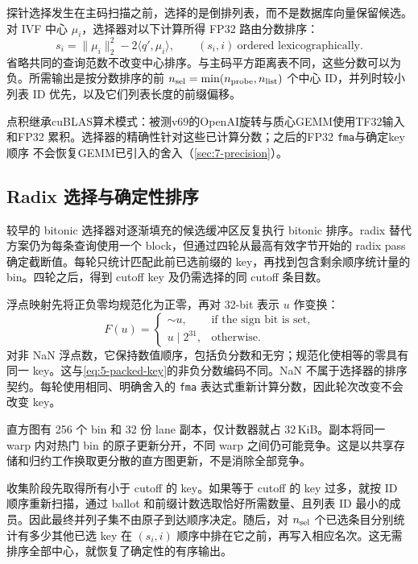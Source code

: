 探针选择发生在主码扫描之前，选择的是倒排列表，而不是数据库向量保留候选。对 IVF 中心 $\mu_i$，选择器对以下计算所得 FP32 路由分数排序：
\begin{equation}
 s_i=\|\mu_i\|_2^2-2\langle q',\mu_i\rangle,
 \qquad (s_i,i)\ \text{ordered lexicographically}.
 \label{eq:5-probe-score}
\end{equation}
省略共同的查询范数不改变中心排序。与主码平方距离表不同，这些分数可以为负。所需输出是按分数排序的前 $n_{\rm sel}=\min(n_{\rm probe},n_{\rm list})$ 个中心 ID，并列时较小列表 ID 优先，以及它们列表长度的前缀偏移。

点积继承cuBLAS算术模式：被测v69的OpenAI旋转与质心GEMM使用TF32输入和FP32
累积。选择器的精确性针对这些已计算分数；之后的FP32 \texttt{fma}与确定key顺序
不会恢复GEMM已引入的舍入（\cref{sec:7-precision}）。

\subsection{Radix 选择与确定性排序}

较早的 bitonic 选择器对逐渐填充的候选缓冲区反复执行 bitonic 排序。radix 替代方案仍为每条查询使用一个 block，但通过四轮从最高有效字节开始的 radix pass 确定截断值。每轮只统计匹配此前已选前缀的 key，再找到包含剩余顺序统计量的 bin。四轮之后，得到 cutoff key 及仍需选择的同 cutoff 条目数。

浮点映射先将正负零均规范化为正零，再对 32-bit 表示 $u$ 作变换：
\begin{equation}
 F(u)=\begin{cases}
       \mathop{\sim}u,&\text{if the sign bit is set},\\
       u\mathbin{|}2^{31},&\text{otherwise}.
      \end{cases}
 \label{eq:5-probe-key}
\end{equation}
对非 NaN 浮点数，它保持数值顺序，包括负分数和无穷；规范化使相等的零具有同一 key。这与\cref{eq:5-packed-key}的非负分数编码不同。NaN 不属于选择器的排序契约。每轮使用相同、明确舍入的 \texttt{fma} 表达式重新计算分数，因此轮次改变不会改变 key。

直方图有 256 个 bin 和 32 份 lane 副本，仅计数器就占 32\,KiB。副本将同一 warp 内对热门 bin 的原子更新分开，不同 warp 之间仍可能竞争。这是以共享存储和归约工作换取更分散的直方图更新，不是消除全部竞争。

收集阶段先取得所有小于 cutoff 的 key。如果等于 cutoff 的 key 过多，就按 ID 顺序重新扫描，通过 ballot 和前缀计数选取恰好所需数量、且列表 ID 最小的成员。因此最终并列子集不由原子到达顺序决定。随后，对 $n_{\rm sel}$ 个已选条目分别统计有多少其他已选 key 在 $(s_i,i)$ 顺序中排在它之前，再写入相应名次。这无需排序全部中心，就恢复了确定性的有序输出。

